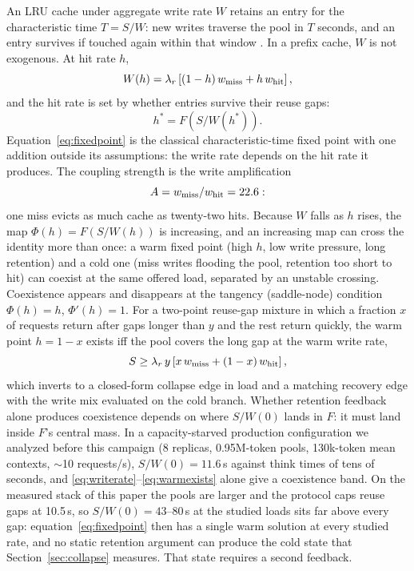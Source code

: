 An LRU cache under aggregate write rate $W$ retains an entry for the
characteristic time $T = S / W$: new writes traverse the pool in $T$
seconds, and an entry survives if touched again within that window
\cite{che2002hierarchical,fricker2012versatile}. In a prefix cache, $W$ is
not exogenous. At hit rate $h$,
\begin{equation}
W(h) = \lambda_r \left[ (1 - h)\, w_{\mathrm{miss}} + h\, w_{\mathrm{hit}} \right],
\label{eq:writerate}
\end{equation}
and the hit rate is set by whether entries survive their reuse gaps:
\begin{equation}
h^* = F\!\left( S / W(h^*) \right).
\label{eq:fixedpoint}
\end{equation}
Equation~\eqref{eq:fixedpoint} is the classical characteristic-time fixed point with
one addition outside its assumptions: the write rate depends on the
hit rate it produces. The coupling strength is the write
amplification
\begin{equation}
A = w_{\mathrm{miss}} / w_{\mathrm{hit}} = 22.6:
\label{eq:amp}
\end{equation}
one miss evicts as much cache as twenty-two hits. Because $W$ falls as
$h$ rises, the map $\Phi(h) = F(S / W(h))$ is increasing, and an
increasing map can cross the identity more than once: a warm fixed
point (high $h$, low write pressure, long retention) and a cold one
(miss writes flooding the pool, retention too short to hit) can
coexist at the same offered load, separated by an unstable crossing.
Coexistence appears and disappears at the tangency (saddle-node)
condition $\Phi(h) = h$, $\Phi'(h) = 1$. For a two-point reuse-gap mixture
in which a fraction $x$ of requests return after gaps longer than $y$
and the rest return quickly, the warm point $h = 1 - x$ exists iff the
pool covers the long gap at the warm write rate,
\begin{equation}
S \geq \lambda_r\, y \left[ x\, w_{\mathrm{miss}} + (1 - x)\, w_{\mathrm{hit}} \right],
\label{eq:warmexists}
\end{equation}
which inverts to a closed-form collapse edge in load and a matching
recovery edge with the write mix evaluated on the cold branch.
Whether retention feedback alone produces coexistence depends on
where $S / W(0)$ lands in $F$: it must land inside $F$'s central mass. In
a capacity-starved production configuration we analyzed before this
campaign (8 replicas, 0.95M-token pools, 130k-token mean contexts,
$\sim$10 requests/s), $S / W(0) = 11.6$\,s against think times of tens of
seconds, and \eqref{eq:writerate}--\eqref{eq:warmexists} alone give a coexistence band. On the measured
stack of this paper the pools are larger and the protocol caps reuse
gaps at 10.5\,s, so $S / W(0) = 43$--$80$\,s at the studied loads sits far
above every gap: equation~\eqref{eq:fixedpoint} then has a single warm solution at
every studied rate, and no static retention argument can produce the
cold state that Section~\ref{sec:collapse} measures. That state requires a second
feedback.

